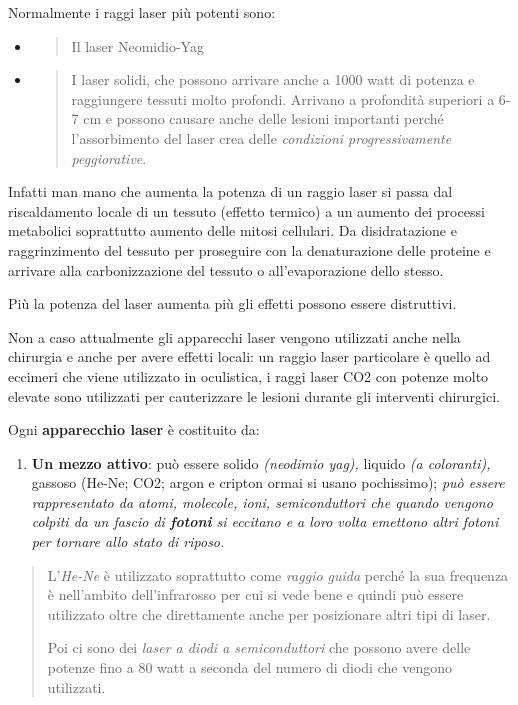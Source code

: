 \documentclass[]{article}
\begin{document}
Normalmente i raggi laser più potenti sono:

\begin{itemize}
\item
  \begin{quote}
  Il laser Neomidio-Yag
  \end{quote}
\item
  \begin{quote}
  I laser solidi, che possono arrivare anche a 1000 watt di potenza e
  raggiungere tessuti molto profondi. Arrivano a profondità superiori a
  6-7 cm e possono causare anche delle lesioni importanti perché
  l'assorbimento del laser crea delle \emph{condizioni progressivamente
  peggiorative}.
  \end{quote}
\end{itemize}

Infatti man mano che aumenta la potenza di un raggio laser si passa dal
riscaldamento locale di un tessuto (effetto termico) a un aumento dei
processi metabolici soprattutto aumento delle mitosi cellulari. Da
disidratazione e raggrinzimento del tessuto per proseguire con la
denaturazione delle proteine e arrivare alla carbonizzazione del tessuto
o all'evaporazione dello stesso.

Più la potenza del laser aumenta più gli effetti possono essere
distruttivi.

Non a caso attualmente gli apparecchi laser vengono utilizzati anche
nella chirurgia e anche per avere effetti locali: un raggio laser
particolare è quello ad eccimeri che viene utilizzato in oculistica, i
raggi laser CO2 con potenze molto elevate sono utilizzati per
cauterizzare le lesioni durante gli interventi chirurgici.

Ogni \textbf{apparecchio laser} è costituito da:

\begin{enumerate}
\def\labelenumi{\arabic{enumi})}
\item
  \textbf{Un mezzo attivo}: può essere solido \emph{(neodimio yag),}
  liquido \emph{(a coloranti),} gassoso (He-Ne; CO2; argon e cripton
  ormai si usano pochissimo); \emph{può essere rappresentato da atomi,
  molecole, ioni, semiconduttori che quando vengono colpiti da un fascio
  di \textbf{fotoni} si eccitano e a loro volta emettono altri fotoni
  per tornare allo stato di riposo.}
\end{enumerate}

\begin{quote}
L'\emph{He-Ne} è utilizzato soprattutto come \emph{raggio guida} perché
la sua frequenza è nell'ambito dell'infrarosso per cui si vede bene e
quindi può essere utilizzato oltre che direttamente anche per
posizionare altri tipi di laser.

Poi ci sono dei \emph{laser a diodi a semiconduttori} che possono avere
delle potenze fino a 80 watt a seconda del numero di diodi che vengono
utilizzati.
\end{quote}
\end{document}
